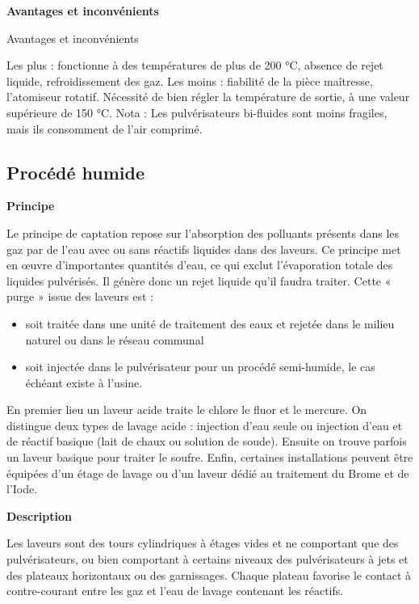 \textbf{Avantages et inconvénients}
\vspace{0.3cm}

Avantages et inconvénients
\vspace{0.3cm}

Les plus : fonctionne à des températures de plus de 200 °C, absence de rejet liquide, refroidissement des gaz.
Les moins : fiabilité de la pièce maîtresse, l’atomiseur rotatif. Nécessité de bien régler la température de sortie, à une valeur supérieure de 150 °C.
Nota : Les pulvérisateurs bi-fluides sont moins fragiles, mais ils consomment de l’air comprimé.

\subsection{Procédé humide}
\vspace{0.3cm}
\textbf{Principe}
\vspace{0.3cm}

Le principe de captation repose sur l’absorption des polluants présents dans les gaz par de l’eau avec ou sans réactifs liquides dans des laveurs. Ce principe met en œuvre d’importantes quantités d’eau, ce qui exclut l’évaporation totale des liquides pulvérisés. Il génère donc un rejet liquide qu’il faudra traiter. Cette « purge » issue des laveurs est :

\begin{itemize}
\item 	soit traitée dans une unité de traitement des eaux et rejetée dans le milieu naturel ou dans le réseau communal
\item 	soit injectée dans le pulvérisateur pour un procédé semi-humide, le cas échéant existe à l'usine.
\end{itemize}

En premier lieu un laveur acide traite le chlore le fluor et le mercure. On distingue deux types de lavage acide : injection d’eau seule ou injection d’eau et de réactif basique (lait de chaux ou solution de soude).
Ensuite on trouve parfois un laveur basique pour traiter le soufre.
Enfin, certaines installations peuvent être équipées d’un étage de lavage ou d’un laveur dédié au traitement du Brome et de l’Iode. 

\vspace{0.3cm}
\textbf{Description}
\vspace{0.3cm} 

Les laveurs sont des tours cylindriques à étages vides et ne comportant que des pulvérisateurs, ou bien comportant à certains niveaux des pulvérisateurs à jets et des plateaux horizontaux ou des garnissages. Chaque plateau favorise le contact à contre-courant entre les gaz et l’eau de lavage contenant les réactifs.


